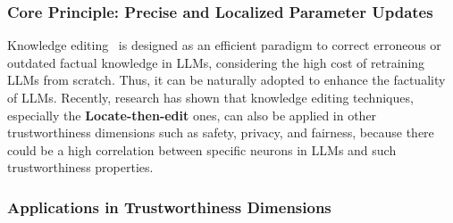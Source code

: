\subsubsection{Core Principle: Precise and Localized Parameter Updates}





Knowledge editing~\citep{wang2024knowledge} is designed as an efficient
paradigm to correct erroneous or outdated factual knowledge in LLMs, considering
the high cost of retraining LLMs from scratch. Thus, it can be naturally adopted to enhance the factuality of LLMs. Recently, research has shown that knowledge editing techniques, especially the \textbf{Locate-then-edit} ones, can also be applied in other trustworthiness dimensions such as safety, privacy, and fairness, because there could be a high correlation between specific neurons in LLMs and such trustworthiness properties. 




\subsubsection{Applications in Trustworthiness Dimensions}


